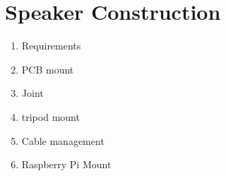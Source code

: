 \chapter{Speaker Construction}

\begin{enumerate}
  \item Requirements
  \item PCB mount
  \item Joint
  \item tripod mount
  \item Cable management
  \item Raspberry Pi Mount
\end{enumerate}



